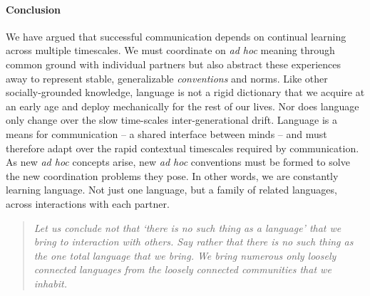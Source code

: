 \paragraph{Conclusion}

We have argued that successful communication depends on continual learning across multiple timescales. 
We must coordinate on \emph{ad hoc} meaning through common ground with individual partners but also abstract these experiences away to represent stable, generalizable \emph{conventions} and norms.
Like other socially-grounded knowledge, language is not a rigid dictionary that we acquire at an early age and deploy mechanically for the rest of our lives. 
Nor does language only change over the slow time-scales inter-generational drift.
Language is a means for communication -- a shared interface between minds -- and must therefore adapt over the rapid contextual timescales required by communication.
As new \emph{ad hoc} concepts arise, new \emph{ad hoc} conventions must be formed to solve the new coordination problems they pose.
In other words, we are constantly learning language. 
Not just one language, but a family of related languages, across interactions with each partner. 

\begin{quote}
\emph{Let us conclude not that ‘there is no such thing as a language’ that we bring to interaction with others. Say rather that there is no such thing as the one total language that we bring. We bring numerous only loosely connected languages from the loosely connected communities that we inhabit.} \cite{hacking1986nice}
\end{quote}
